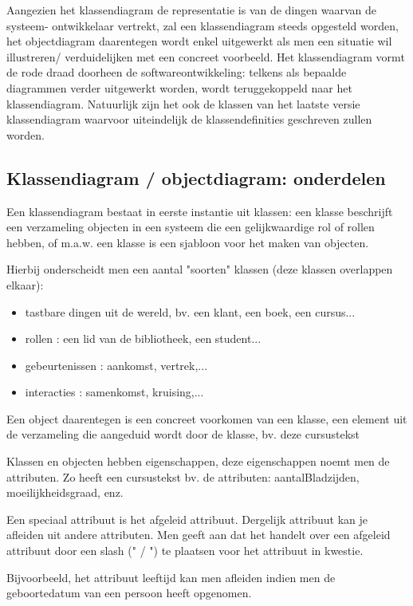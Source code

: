 Aangezien het klassendiagram de representatie is van de dingen waarvan de systeem- ontwikkelaar vertrekt, zal een klassendiagram steeds opgesteld worden, het objectdiagram daarentegen wordt enkel uitgewerkt als men een situatie wil illustreren/ verduidelijken met een concreet voorbeeld.
Het klassendiagram vormt de rode draad doorheen de softwareontwikkeling: telkens als bepaalde diagrammen verder uitgewerkt worden, wordt teruggekoppeld naar het klassendiagram. Natuurlijk zijn het ook de klassen van het laatste versie klassendiagram waarvoor uiteindelijk de klassendefinities geschreven zullen worden.

\subsection{Klassendiagram / objectdiagram: onderdelen}

Een klassendiagram bestaat in eerste instantie uit klassen: een klasse beschrijft een verzameling objecten in een systeem die een gelijkwaardige rol of rollen hebben, of m.a.w. een klasse is een sjabloon voor het maken van objecten.

Hierbij onderscheidt men een aantal "soorten" klassen (deze klassen overlappen elkaar):

\begin{itemize}
    \item tastbare dingen uit de wereld, bv. een klant, een boek, een cursus...
    \item rollen : een lid van de bibliotheek, een student... 
    \item gebeurtenissen : aankomst, vertrek,...
    \item interacties : samenkomst, kruising,...
\end{itemize}

Een object daarentegen is een concreet voorkomen van een klasse, een element uit de verzameling die aangeduid wordt door de klasse, bv. deze cursustekst

Klassen en objecten hebben eigenschappen, deze eigenschappen noemt men de attributen. Zo heeft een cursustekst bv. de attributen: aantalBladzijden, moeilijkheidsgraad, enz.

Een speciaal attribuut is het afgeleid attribuut. Dergelijk attribuut kan je afleiden uit andere attributen. Men geeft aan dat het handelt over een afgeleid attribuut door een slash (" / ") te plaatsen voor het attribuut in kwestie.

Bijvoorbeeld, het attribuut leeftijd kan men afleiden indien men de geboortedatum van een persoon heeft opgenomen.

